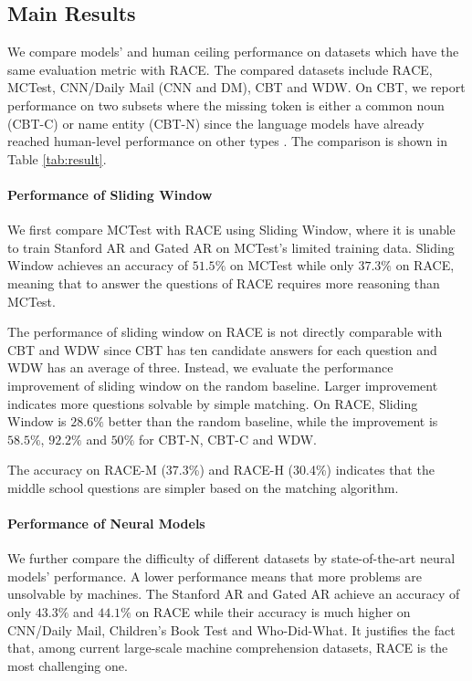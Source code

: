 \subsection{Main Results} We compare models' and human ceiling performance on datasets which have the same evaluation metric with RACE. The compared datasets include RACE, MCTest, { CNN/Daily Mail} (CNN and DM), CBT and  WDW. On CBT, we report performance on two subsets where the missing token is either a common noun (CBT-C) or name entity (CBT-N) since the language models have already reached human-level performance on other types \cite{hill2015goldilocks}.  The comparison is shown in Table \ref{tab:result}.

\paragraph{Performance of Sliding Window} We first compare MCTest with RACE using Sliding Window, where it is unable to train Stanford AR and Gated AR on MCTest's limited training data. Sliding Window achieves an accuracy of $51.5\%$ on MCTest while only $37.3\%$ on RACE, meaning that to answer the questions of RACE requires more reasoning than MCTest. 

The performance of sliding window on RACE is not directly comparable with CBT and WDW since CBT has ten candidate answers for each question and WDW has an average of three.  Instead, we evaluate the performance improvement of sliding window on the random baseline. Larger improvement indicates more questions solvable by simple matching. On RACE, Sliding Window is $28.6\%$ better than the random baseline, while the improvement is $58.5\%$, $92.2\%$ and $50\%$ for CBT-N, CBT-C and WDW.

The accuracy on RACE-M (37.3\%) and RACE-H (30.4\%) indicates that the middle school questions are simpler based on the matching algorithm. 

\paragraph{Performance of Neural Models} We further compare the difficulty of different datasets by state-of-the-art neural models' performance. A lower performance means that more problems are unsolvable by machines. The Stanford AR and Gated AR achieve an accuracy of only $43.3\%$ and $44.1\%$ on RACE while their accuracy is much higher on { CNN/Daily Mail}, { Children’s Book Test} and Who-Did-What. It justifies the fact that, among current large-scale machine comprehension datasets, RACE is the most challenging one. 

